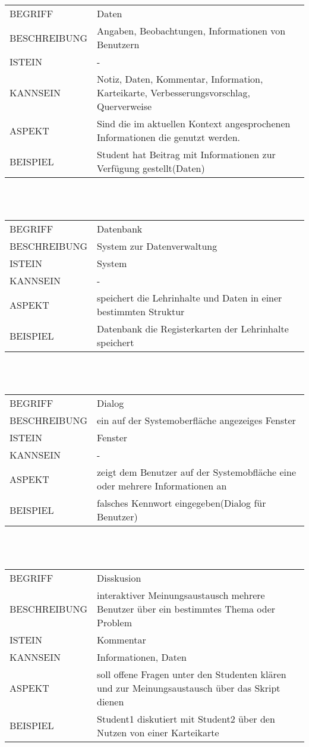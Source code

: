 \documentclass[12pt,a4paper]{article}
\begin{document}
\begin{tabular}{l p{10cm}}
BEGRIFF 	 & Daten \\ 
BESCHREIBUNG & Angaben, Beobachtungen, Informationen von Benutzern\\ 
ISTEIN   	 & -\\
KANNSEIN 	 & Notiz, Daten, Kommentar, Information, Karteikarte, Verbesserungsvorschlag, 					   Querverweise\\ 
ASPEKT   	 & Sind die im aktuellen Kontext angesprochenen Informationen die genutzt werden.\\
BEISPIEL 	 & Student hat Beitrag mit Informationen zur Verfügung gestellt(Daten) \\
\hline
\end{tabular}\\\\  

\begin{tabular}{l p{10cm}}
BEGRIFF 	 & Datenbank \\ 
BESCHREIBUNG & System zur Datenverwaltung\\ 
ISTEIN   	 & System\\
KANNSEIN 	 & - \\ 
ASPEKT   	 & speichert die Lehrinhalte und Daten in einer bestimmten Struktur\\
BEISPIEL 	 & Datenbank die Registerkarten der Lehrinhalte speichert\\
\hline
\end{tabular}\\\\ 

\begin{tabular}{l p{10cm}}
BEGRIFF 	 & Dialog \\ 
BESCHREIBUNG & ein auf der Systemoberfläche angezeiges Fenster\\ 
ISTEIN   	 & Fenster\\
KANNSEIN 	 & - \\ 
ASPEKT   	 & zeigt dem Benutzer auf der Systemobfläche eine oder mehrere Informationen an\\
BEISPIEL 	 & falsches Kennwort eingegeben(Dialog für Benutzer)\\
\hline
\end{tabular}\\\\  

\begin{tabular}{l p{10cm}}
BEGRIFF 	 & Disskusion \\ 
BESCHREIBUNG & interaktiver Meinungsaustausch mehrere Benutzer über ein bestimmtes Thema oder Problem\\ 
ISTEIN   	 & Kommentar\\
KANNSEIN 	 & Informationen, Daten\\ 
ASPEKT   	 & soll offene Fragen unter den Studenten klären und zur Meinungsaustausch über das Skript dienen \\
BEISPIEL 	 & Student1 diskutiert mit Student2 über den Nutzen von einer Karteikarte \\
\hline
\end{tabular}\\\\  
\end{document}
